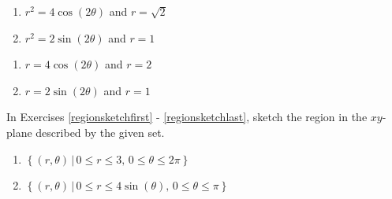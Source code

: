 \begin{multicols}{2} 

\begin{enumerate}

\setcounter{enumi}{\value{HW}}

\item $r^2 = 4\cos(2\theta)$ and $r = \sqrt{2}$
\item $r^{2} = 2\sin(2\theta)$ and $r = 1$

\setcounter{HW}{\value{enumi}}

\end{enumerate}

\end{multicols}

\begin{multicols}{2} 

\begin{enumerate}

\setcounter{enumi}{\value{HW}}

\item $r = 4\cos(2\theta)$ and $r=2$
\item $r = 2\sin(2\theta)$ and $r = 1$ \label{findpolarintlast}

\setcounter{HW}{\value{enumi}}

\end{enumerate}

\end{multicols}

In Exercises \ref{regionsketchfirst} - \ref{regionsketchlast}, sketch the region in the $xy$-plane described by the given set.

\begin{multicols}{2} 

\begin{enumerate}

\setcounter{enumi}{\value{HW}}

\item $\left\{ (r,\theta) \, | \, 0 \leq r \leq 3, \,0 \leq \theta \leq 2\pi \right\}$ \label{regionsketchfirst}
\item $\left\{ (r,\theta) \, | \, 0 \leq r \leq 4\sin(\theta), \,0 \leq \theta \leq \pi \right\}$

\setcounter{HW}{\value{enumi}}

\end{enumerate}

\end{multicols}

